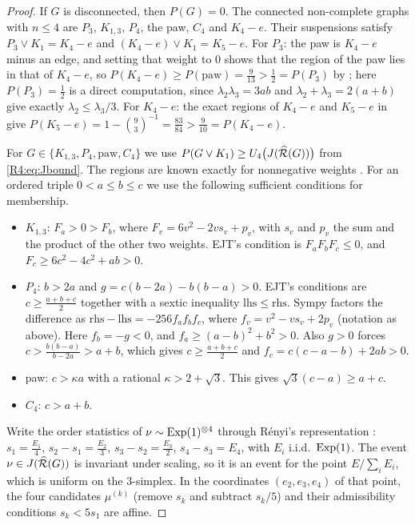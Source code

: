 \documentclass[11pt]{amsart}
\theoremstyle{definition}
\theoremstyle{remark}
\begin{document}
\begin{proof}
If $G$ is disconnected, then $P(G)=0$.  The connected non-complete graphs
with $n\le4$ are $P_3$, $K_{1,3}$, $P_4$, the paw, $C_4$ and $K_4-e$.
Their suspensions satisfy $P_3\vee K_1=K_4-e$ and $(K_4-e)\vee K_1=K_5-e$.
For $P_3$: the paw is $K_4-e$ minus an edge, and setting that weight to $0$
shows that the region of the paw lies in that of $K_4-e$, so
$P(K_4-e)\ge P(\mathrm{paw})=\frac9{13}>\frac12=P(P_3)$ by
\cite[Theorem~6.1]{R4-EJT}; here $P(P_3)=\frac12$ is a direct computation, since
$\lambda_2\lambda_3=3ab$ and $\lambda_2+\lambda_3=2(a+b)$ give exactly
$\lambda_2\le\lambda_3/3$. For $K_4-e$: the exact regions of $K_4-e$ and
$K_5-e$ in \cite{K-015} give $P(K_5-e)=1-\binom93^{-1}=\frac{83}{84}>\frac9{10}=P(K_4-e)$.

For $G\in\{K_{1,3},P_4,\mathrm{paw},C_4\}$ we use $P(G\vee K_1)\ge
U_4\bigl(J(\widehat{\mathcal{R}}(G))\bigr)$ from \eqref{R4:eq:Jbound}.  The regions
are known exactly for nonnegative weights \cite[Theorems~3.1, 4.1, 5.1,
6.1]{R4-EJT}.  For an ordered triple $0<a\le b\le c$ we use the following
sufficient conditions for membership.
\begin{itemize}
\item $K_{1,3}$: $F_a>0>F_b$, where $F_v=6v^2-2vs_v+p_v$, with $s_v$ and $p_v$ the sum and the product
of the other two weights.  EJT's condition is $F_aF_bF_c\le0$,
and $F_c\ge6c^2-4c^2+ab>0$.
\item $P_4$: $b>2a$ and $g=c(b-2a)-b(b-a)>0$.  EJT's conditions are
$c\ge\frac{a+b+c}2$ together with a sextic inequality $\mathrm{lhs}\le
\mathrm{rhs}$.  Sympy factors the difference as
$\mathrm{rhs}-\mathrm{lhs}=-256f_af_bf_c$, where
$f_v=v^2-vs_v+2p_v$ (notation as above).
Here $f_b=-g<0$, and $f_a\ge(a-b)^2+b^2>0$.  Also $g>0$ forces
$c>\frac{b(b-a)}{b-2a}>a+b$, which gives $c\ge\frac{a+b+c}2$ and
$f_c=c(c-a-b)+2ab>0$.
\item paw: $c>\kappa a$ with a rational $\kappa>2+\sqrt3$.  This gives
$\sqrt3(c-a)\ge a+c$.
\item $C_4$: $c>a+b$.
\end{itemize}

Write the order statistics of $\nu\sim\operatorname{Exp}(1)^{\otimes4}$ through
R\'enyi's representation \cite{R4-Renyi}: $s_1=\frac{E_1}4$,
$s_2-s_1=\frac{E_2}3$, $s_3-s_2=\frac{E_3}2$, $s_4-s_3=E_4$, with $E_i$
i.i.d.\ $\operatorname{Exp}(1)$.  The event $\nu\in J(\widehat{\mathcal{R}}(G))$ is invariant under
scaling, so it is an event for the point $E/\sum_iE_i$, which is uniform on
the $3$-simplex.  In the coordinates $(e_2,e_3,e_4)$ of that point, the
four candidates $\mu^{(k)}$ (remove $s_k$ and subtract $s_k/5$) and their
admissibility conditions $s_k<5s_1$ are affine.


\end{proof}
\end{document}
